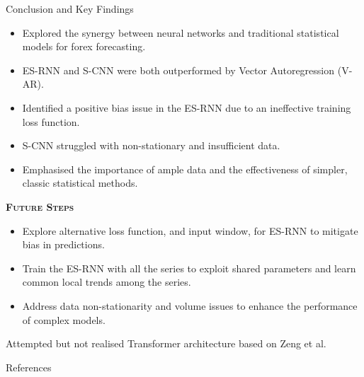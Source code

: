 \documentclass[aspectratio=169, 12pt]{beamer}
\begin{document}
\begin{frame}[allowframebreaks]{Conclusion and Key Findings}
        \begin{itemize}
            \item Explored the synergy between neural networks and traditional statistical models for forex forecasting.
            \item ES-RNN and S-CNN were both outperformed by Vector Autoregression (V-AR).
            \item Identified a positive bias issue in the ES-RNN due to an ineffective training loss function.
            \item S-CNN struggled with non-stationary and insufficient data.
            \item Emphasised the importance of ample data and the effectiveness of simpler, classic statistical methods.
        \end{itemize}
    \newpage
    \begin{center}
        \textsc{\textbf{Future Steps}}
    \end{center}
        \begin{itemize}
            \item Explore alternative loss function, and input window, for ES-RNN to mitigate bias in predictions.
            \item Train the ES-RNN with all the series to exploit shared parameters and learn common local trends among the series.
            \item Address data non-stationarity and volume issues to enhance the performance of complex models.
        \end{itemize}
\end{frame}

\begin{frame}{Attempted but not realised}
Transformer architecture based on Zeng et al. \cite{transformer}
    \begin{figure}[htbp]
\centering
\def\svgwidth{0.6\columnwidth}

\end{figure}
\end{frame}

\begin{frame}[allowframebreaks]{References}

  
  

\end{frame}
\end{document}

